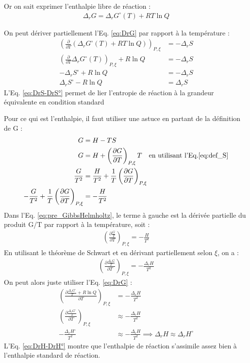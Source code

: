 \documentclass[twoside,a4paper,11pt,answers,addpoints]{exam}
\begin{document}
Or on sait exprimer l'enthalpie libre de réaction : 
\begin{align}
\Delta_r G = \Delta_r G^\circ (T) + RT \ln Q
\label{eq:DrG}
\end{align}

On peut dériver partiellement l'Eq. \ref{eq:DrG} par rapport à la température : 
\begin{align}
\left( \frac{\partial}{\partial T} (\Delta_r G^\circ (T) + RT \ln Q) \right)_{P, \xi} &= - \Delta_r S \\
\left( \frac{\partial}{\partial T} \Delta_r G^\circ (T)\right)_{P, \xi}  + R \ln Q   &= - \Delta_r S \\
-\Delta_r S^\circ  + R \ln Q  &= - \Delta_r S \\
\Delta_r S^\circ  - R \ln Q  &= \Delta_r S \label{eq:DrS-DrS°}
\end{align}
L'Eq. \ref{eq:DrS-DrS°} permet de lier l'entropie de réaction à la grandeur équivalente en condition standard

Pour ce qui est l'enthalpie, il faut utiliser une astuce en partant de la définition de G : 
\begin{align}
G &= H - T S \\
G &= H + \left( \frac{\partial G}{\partial T} \right)_{P, \xi} T \quad \text{en utilisant l'Eq.}\ref{eq:def_S} \\
\frac{G}{T^2} &= \frac{H}{T^2} + \frac{1}{T} \left( \frac{\partial G}{\partial T} \right)_{P, \xi} \\
- \frac{G}{T^2} + \frac{1}{T} \left( \frac{\partial G}{\partial T} \right)_{P, \xi} &= - \frac{H}{T^2} \label{eq:pre_GibbsHelmholtz}
\end{align}
Dans l'Eq. \ref{eq:pre_GibbsHelmholtz}, le terme à gauche est la dérivée partielle du produit G/T par rapport à la température, soit : 
\begin{align}
\left( \frac{\partial \frac{G}{T}}{\partial T} \right)_{P, \xi} = - \frac{H}{T^2}
\end{align}
En utilisant le théorème de Schwart et en dérivant partiellement selon $\xi$, on a : 
\begin{align}
\left( \frac{\partial \frac{\Delta_r G}{T}}{\partial T} \right)_{P, \xi} = - \frac{\Delta_r H}{T^2}
\end{align}
On peut alors juste utiliser l'Eq. \ref{eq:DrG} :
\begin{align}
\left( \frac{\partial \frac{\Delta_r G^\circ}{T} + R \ln Q}{\partial T} \right)_{P, \xi} &= - \frac{\Delta_r H}{T^2} \\
\left( \frac{\partial \frac{\Delta_r G^\circ}{T}}{\partial T} \right)_{P, \xi} &\approx - \frac{\Delta_r H}{T^2} \\
- \frac{\Delta_r H^\circ}{T^2} &\approx - \frac{\Delta_r H}{T^2} \implies  \Delta_r H \approx \Delta_r H^\circ \label{eq:DrH-DrH°}
\end{align}
L'Eq. \ref{eq:DrH-DrH°} montre que l'enthalpie de réaction s'assimile assez bien à l'enthalpie standard de réaction.

\newpage

\begin{center}
\gradetable
\end{center}
\end{document}

